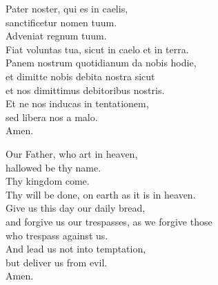 \documentclass{article}
\newcommand{\startParallel}{\begin{paracol}{2}}
\newcommand{\latin}[1]{#1\switchcolumn}
\newcommand{\vern}[1]{#1\switchcolumn*}
\newcommand{\stopParallel}{\end{paracol}}
\begin{document}
\startParallel

\latin{
	Pater noster, qui es in caelis,\\
	sanctificetur nomen tuum.\\
	Adveniat regnum tuum.\\
	Fiat voluntas tua, sicut in caelo et in terra.\\
	Panem nostrum quotidianum da nobis hodie,\\
	et dimitte nobis debita nostra sicut\\
	et nos dimittimus debitoribus nostris.\\
	Et ne nos inducas in tentationem,\\
	sed libera nos a malo.\\
	Amen.
}

\vern{
	Our Father, who art in heaven,\\
	hallowed be thy name.\\
	Thy kingdom come.\\
	Thy will be done, on earth as it is in heaven.\\
	Give us this day our daily bread,\\
	and forgive us our trespasses, as we forgive those\\
	who trespass against us.\\
	And lead us not into temptation,\\
	but deliver us from evil.\\
	Amen.
}

\stopParallel
\end{document}
